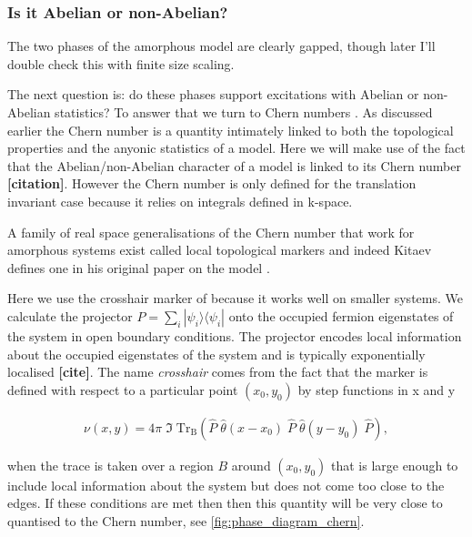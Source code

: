 \hypertarget{is-it-abelian-or-non-abelian}{%
\subsubsection{Is it Abelian or non-Abelian?}\label{is-it-abelian-or-non-abelian}}

The two phases of the amorphous model are clearly gapped, though later I'll double check this with finite size scaling.

The next question is: do these phases support excitations with Abelian or non-Abelian statistics? To answer that we turn to Chern numbers \autocite{berryQuantalPhaseFactors1984,simonHolonomyQuantumAdiabatic1983,thoulessQuantizedHallConductance1982}. As discussed earlier the Chern number is a quantity intimately linked to both the topological properties and the anyonic statistics of a model. Here we will make use of the fact that the Abelian/non-Abelian character of a model is linked to its Chern number \textbf{{[}citation{]}}. However the Chern number is only defined for the translation invariant case because it relies on integrals defined in k-space.

A family of real space generalisations of the Chern number that work for amorphous systems exist called local topological markers \autocite{bianco_mapping_2011,Hastings_Almost_2010,mitchellAmorphousTopologicalInsulators2018} and indeed Kitaev defines one in his original paper on the model \textcite{kitaevAnyonsExactlySolved2006}.

Here we use the crosshair marker of \textcite{peru_preprint} because it works well on smaller systems. We calculate the projector \(P = \sum_i |\psi_i\rangle \langle \psi_i|\) onto the occupied fermion eigenstates of the system in open boundary conditions. The projector encodes local information about the occupied eigenstates of the system and is typically exponentially localised \textbf{{[}cite{]}}. The name \emph{crosshair} comes from the fact that the marker is defined with respect to a particular point \((x_0, y_0)\) by step functions in x and y

\[\begin{aligned}
    \nu (x, y) = 4\pi \; \Im\; \mathrm{Tr}_{\mathrm{B}} 
    \left ( 
    \hat{P}\;\hat{\theta}(x-x_0)\;\hat{P}\;\hat{\theta}(y-y_0)\; \hat{P}
    \right ),
\end{aligned}\]

when the trace is taken over a region \(B\) around \((x_0, y_0)\) that is large enough to include local information about the system but does not come too close to the edges. If these conditions are met then then this quantity will be very close to quantised to the Chern number, see \cref{fig:phase_diagram_chern}.

